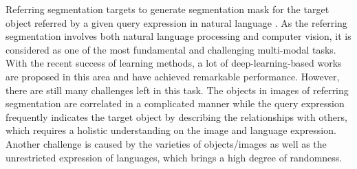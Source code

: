 \documentclass[10pt,twocolumn,letterpaper]{article}
\begin{document}
Referring segmentation targets to generate segmentation mask for the target object referred by a given query expression in natural language \cite{hu2016segmentation,liu2017recurrent,li2018referring,ding2020phraseclick}. As the referring segmentation involves both natural language processing and computer vision, it is considered as one of the most fundamental and challenging multi-modal tasks. With the recent success of learning methods, a lot of deep-learning-based works are proposed in this area and have achieved remarkable performance. However, there are still many challenges left in this task. The objects in images of referring segmentation are correlated in a complicated manner while the query expression frequently indicates the target object by describing the relationships with others, which requires a holistic understanding on the image and language expression. Another challenge is caused by the varieties of objects/images as well as the unrestricted expression of languages, which brings a high degree of randomness. 
\end{document}
